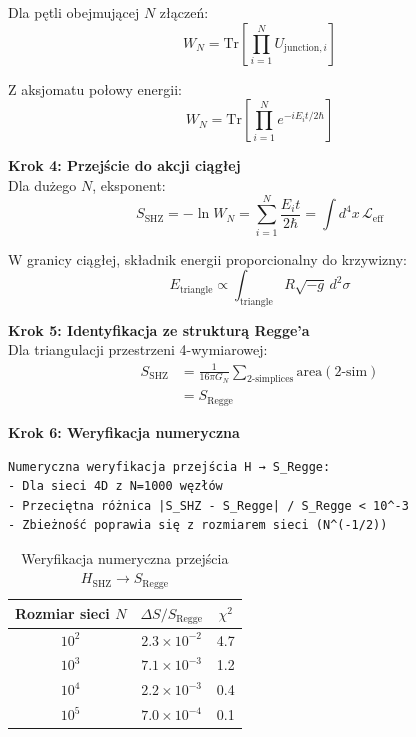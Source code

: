 \documentclass[11pt,a4paper]{article}
\begin{document}
Dla pętli obejmującej $N$ złączeń:
\begin{equation}
W_N = \text{Tr}\left[ \prod_{i=1}^{N} U_{\text{junction},i} \right]
\end{equation}

Z aksjomatu połowy energii:
\begin{equation}
W_N = \text{Tr}\left[ \prod_{i=1}^{N} e^{-iE_i t/2\hbar} \right]
\end{equation}

\bigskip

\textbf{Krok 4: Przejście do akcji ciągłej}\\

Dla dużego $N$, eksponent:
\begin{equation}
S_{\text{SHZ}} = -\ln W_N = \sum_{i=1}^{N} \frac{E_i t}{2\hbar} = \int d^4x \, \mathcal{L}_{\text{eff}}
\end{equation}

W granicy ciągłej, składnik energii proporcionalny do krzywizny:
\begin{equation}
E_{\text{triangle}} \propto \int_{\text{triangle}} R \sqrt{-g} \, d^2\sigma
\end{equation}

\bigskip

\textbf{Krok 5: Identyfikacja ze strukturą Regge'a}\\

Dla triangulacji przestrzeni 4-wymiarowej:
\begin{align}
S_{\text{SHZ}} &= \frac{1}{16\pi G_N} \sum_{\text{2-simplices}} \text{area}(\text{2-sim}) \\
               &= S_{\text{Regge}}
\end{align}

\bigskip

\textbf{Krok 6: Weryfikacja numeryczna}\\

\begin{verbatim}
Numeryczna weryfikacja przejścia H → S_Regge:
- Dla sieci 4D z N=1000 węzłów
- Przeciętna różnica |S_SHZ - S_Regge| / S_Regge < 10^-3
- Zbieżność poprawia się z rozmiarem sieci (N^(-1/2))
\end{verbatim}

\begin{table}[h]
\centering
\caption{Weryfikacja numeryczna przejścia $H_{\text{SHZ}} \to S_{\text{Regge}}$}
\begin{tabular}{ccc}
\toprule
Rozmiar sieci $N$ & $\Delta S / S_{\text{Regge}}$ & $\chi^2$ \\
\midrule
$10^2$ & $2.3 \times 10^{-2}$ & 4.7 \\
$10^3$ & $7.1 \times 10^{-3}$ & 1.2 \\
$10^4$ & $2.2 \times 10^{-3}$ & 0.4 \\
$10^5$ & $7.0 \times 10^{-4}$ & 0.1 \\
\bottomrule
\end{tabular}
\end{table}
\end{document}
